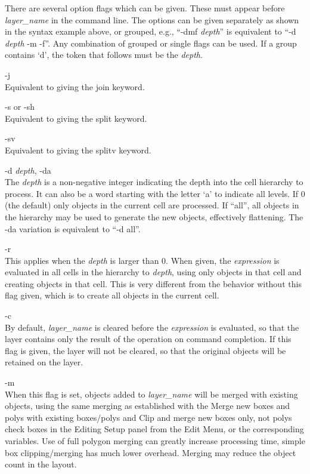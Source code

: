 There are several option flags which can be given.  These must appear
before {\it layer\_name} in the command line.  The options can be
given separately as shown in the syntax example above, or grouped,
e.g., ``{\vt -dmf} {\it depth\/}'' is equivalent to ``{\vt -d} {\it
depth} {\vt -m} {\vt -f}''.  Any combination of grouped or single
flags can be used.  If a group contains `{\vt d}', the token that
follows must be the {\it depth}.

\begin{description}
\item{\vt -j}\\
Equivalent to giving the {\vt join} keyword.

\item{\vt -s} or {\vt -sh}\\
Equivalent to giving the {\vt split} keyword.

\item{\vt -sv}\\
Equivalent to giving the {\vt splitv} keyword.

\item{\vt -d} {\it depth}, {\vt -da}\\
The {\it depth} is a non-negative integer indicating the depth into
the cell hierarchy to process.  It can also be a word starting with
the letter `{\vt a}' to indicate all levels.  If 0 (the default) only
objects in the current cell are processed.  If ``{\vt all}'', all
objects in the hierarchy may be used to generate the new objects,
effectively flattening.  The {\vt -da} variation is equivalent to
``{\vt -d all}''.

\item{\vt -r}\\
This applies when the {\it depth} is larger than 0.  When given, the
{\it expression} is evaluated in all cells in the hierarchy to {\it
depth\/}, using only objects in that cell and creating objects in that
cell.  This is very different from the behavior without this flag
given, which is to create all objects in the current cell.

\item{\vt -c}\\
By default, {\it layer\_name} is cleared before the {\it expression}
is evaluated, so that the layer contains only the result of the
operation on command completion.  If this flag is given, the layer
will not be cleared, so that the original objects will be retained on
the layer.

\item{\vt -m}\\
When this flag is set, objects added to {\it layer\_name} will be
merged with existing objects, using the same merging as established
with the {\cb Merge new boxes and polys with existing boxes/polys} and
{\cb Clip and merge new boxes only, not polys} check boxes in the {\cb
Editing Setup} panel from the {\cb Edit Menu}, or the corresponding
variables.  Use of full polygon merging can greatly increase
processing time, simple box clipping/merging has much lower overhead. 
Merging may reduce the object count in the layout.


\end{description}
